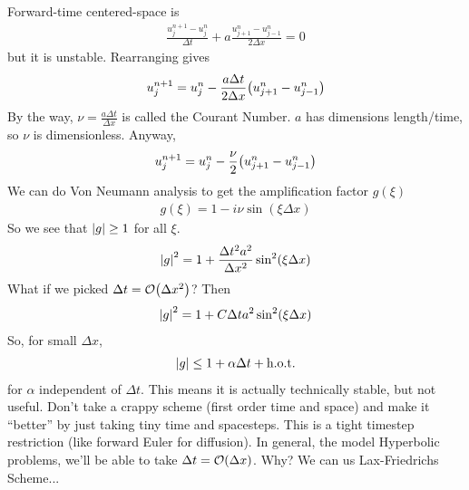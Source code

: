 \documentclass{article}
\newcommand{\Dx}{\Delta x}
\newcommand{\Dt}{\Delta t}
\newcommand{\hot}{\text{h.o.t.}}
\begin{document}
        Forward-time centered-space is
        \begin{align*}
            \frac{u_j^{n+1} - u_j^n}{\Dt} + a\frac{u_{j+1}^n - u_{j-1}^n}{2\Dx} = 0
        \end{align*}
        but it is unstable.  Rearranging gives
        \begin{align*}
            u_j^{n+1} = u_j^n - \frac{a\Dt}{2\Dx}\qty(u_{j+1}^n - u_{j-1}^n)
        \end{align*}
        By the way, $\nu = \frac{a\Dt}{\Dx}$ is called the Courant Number.  $a$ has dimensions length/time, so $\nu$ is dimensionless.  Anyway,
        \begin{align*}
            u_j^{n+1} = u_j^n - \frac{\nu}{2}\qty(u_{j+1}^n - u_{j-1}^n)
        \end{align*}
        We can do Von Neumann analysis to get the amplification factor $g(\xi)$
        \begin{align*}
            g(\xi) = 1 - i\nu\sin(\xi\Dx)
        \end{align*}
        So we see that $\abs{g} \geq 1$ for all $\xi$.
        \begin{align*}
            \abs{g}^2 = 1 + \frac{\Dt^2 a^2}{\Dx^2}\sin^2(\xi\Dx)
        \end{align*}
        What if we picked $\Dt = \order{\Dx^2}$?  Then
        \begin{align*}
            \abs{g}^2 = 1 + C\Dt a^2\sin^2(\xi\Dx)
        \end{align*}
        So, for small $\Dx$,
        \begin{align*}
            \abs{g} \leq 1 + \alpha\Dt + \hot
        \end{align*}
        for $\alpha$ independent of $\Dt$.  This means it is actually technically stable, but not useful.  Don't take a crappy scheme (first order time and space) and make it ``better'' by just taking tiny time and spacesteps.  This is a tight timestep restriction (like forward Euler for diffusion).  In general, the model Hyperbolic problems, we'll be able to take $\Dt = \order{\Dx}$.  Why?  We can us Lax-Friedrichs Scheme...
\end{document}
